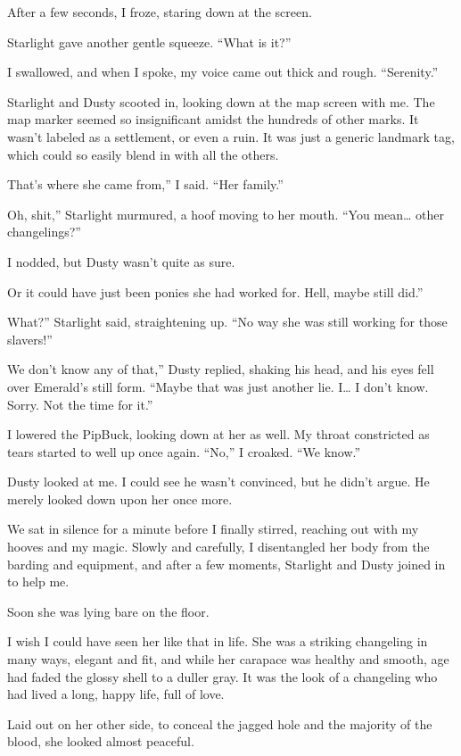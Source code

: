 After a few seconds, I froze, staring down at the screen.

Starlight gave another gentle squeeze. “What is it?”

I swallowed, and when I spoke, my voice came out thick and rough. “Serenity.”

Starlight and Dusty scooted in, looking down at the map screen with me. The map marker seemed so insignificant amidst the hundreds of other marks. It wasn’t labeled as a settlement, or even a ruin. It was just a generic landmark tag, which could so easily blend in with all the others.

\leavevmode{}That’s where she came from,” I said. “Her family.”

\leavevmode{}Oh, shit,” Starlight murmured, a hoof moving to her mouth. “You mean… other changelings?”

I nodded, but Dusty wasn’t quite as sure.

\leavevmode{}Or it could have just been ponies she had worked for. Hell, maybe still did.”

\leavevmode{}What?” Starlight said, straightening up. “No way she was still working for those slavers!”

\leavevmode{}We don’t know any of that,” Dusty replied, shaking his head, and his eyes fell over Emerald’s still form. “Maybe that was just another lie. I… I don’t know. Sorry. Not the time for it.”

I lowered the PipBuck, looking down at her as well. My throat constricted as tears started to well up once again. “No,” I croaked. “We know.”

Dusty looked at me. I could see he wasn’t convinced, but he didn’t argue. He merely looked down upon her once more.

We sat in silence for a minute before I finally stirred, reaching out with my hooves and my magic. Slowly and carefully, I disentangled her body from the barding and equipment, and after a few moments, Starlight and Dusty joined in to help me.

Soon she was lying bare on the floor.

I wish I could have seen her like that in life. She was a striking changeling in many ways, elegant and fit, and while her carapace was healthy and smooth, age had faded the glossy shell to a duller gray. It was the look of a changeling who had lived a long, happy life, full of love.

Laid out on her other side, to conceal the jagged hole and the majority of the blood, she looked almost peaceful.

